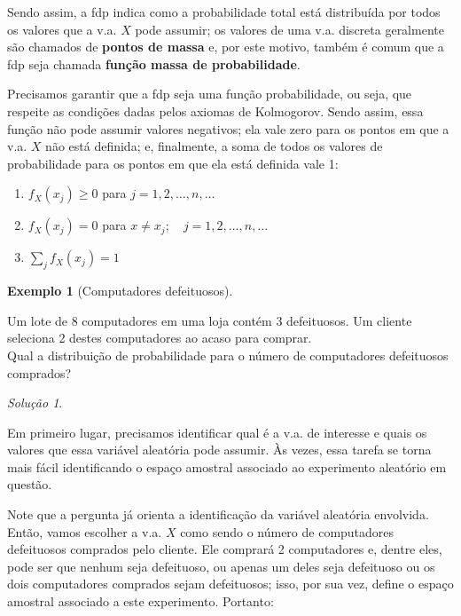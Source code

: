 \documentclass[
]{book}
\providecommand{\tightlist}{%
  \setlength{\itemsep}{0pt}\setlength{\parskip}{0pt}}
\theoremstyle{definition}
\theoremstyle{definition}
\newtheorem{example}{Exemplo}[chapter]
\theoremstyle{definition}
\theoremstyle{remark}
\newtheorem*{solution}{Solução}
\begin{document}
Sendo assim, a fdp indica como a probabilidade total está distribuída por todos os valores que a v.a. \(X\) pode assumir; os valores de uma v.a. discreta geralmente são chamados de \textbf{pontos de massa} e, por este motivo, também é comum que a fdp seja chamada \textbf{função massa de probabilidade}.

Precisamos garantir que a fdp seja uma função probabilidade, ou seja, que respeite as condições dadas pelos axiomas de Kolmogorov. Sendo assim, essa função não pode assumir valores negativos; ela vale zero para os pontos em que a v.a. \(X\) não está definida; e, finalmente, a soma de todos os valores de probabilidade para os pontos em que ela está definida vale 1:

\begin{enumerate}
\def\labelenumi{\arabic{enumi}.}
\tightlist
\item
  \({f_X(x_j) \geq 0}\) para \({j = 1, 2, \ldots, n, \ldots}\)\\
\item
  \({f_X(x_j) = 0}\) para \({x \neq x_j; \quad j = 1, 2, \ldots, n, \ldots}\)\\
\item
  \({\sum_j f_X(x_j) = 1}\)
\end{enumerate}

\begin{example}[Computadores defeituosos]
\protect\hypertarget{exm:unnamed-chunk-5}{}{\label{exm:unnamed-chunk-5} {} }
\end{example}

Um lote de 8 computadores em uma loja contém 3 defeituosos.
Um cliente seleciona 2 destes computadores ao acaso para comprar.\\
Qual a distribuição de probabilidade para o número de computadores defeituosos comprados?

\begin{solution}
{}
\end{solution}

Em primeiro lugar, precisamos identificar qual é a v.a. de interesse e quais os valores que essa variável aleatória pode assumir. Às vezes, essa tarefa se torna mais fácil identificando o espaço amostral associado ao experimento aleatório em questão.

Note que a pergunta já orienta a identificação da variável aleatória envolvida. Então, vamos escolher a v.a. \(X\) como sendo o número de computadores defeituosos comprados pelo cliente. Ele comprará 2 computadores e, dentre eles, pode ser que nenhum seja defeituoso, ou apenas um deles seja defeituoso ou os dois computadores comprados sejam defeituosos; isso, por sua vez, define o espaço amostral associado a este experimento. Portanto:
\end{document}
